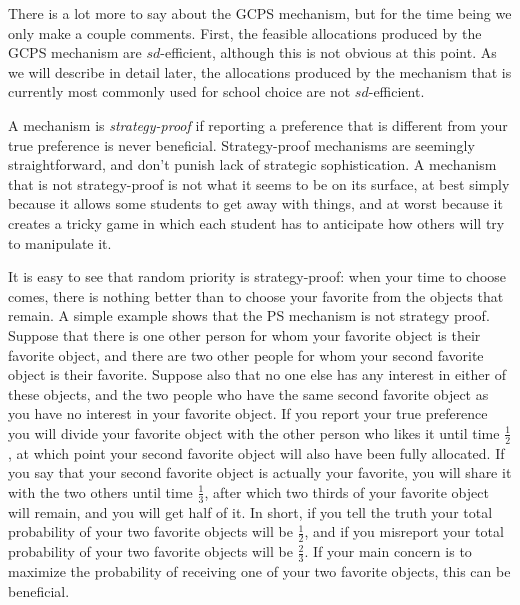 \documentclass[12pt]{article}
\theoremstyle{definition}
\begin{document}
There is a lot more to say about the GCPS mechanism, but for the time
being we only make a couple comments.  First, the feasible allocations
produced by the GCPS mechanism are $sd$-efficient, although this is
not obvious at this point.  As we will describe in detail later, the
allocations produced by the mechanism that is currently most commonly
used for school choice are not $sd$-efficient.

A mechanism is \emph{strategy-proof} if reporting a preference that is
different from your true preference is never beneficial.
Strategy-proof mechanisms are seemingly straightforward, and don't
punish lack of strategic sophistication.  A mechanism that is not
strategy-proof is not what it seems to be on its surface, at best
simply because it allows some students to get away with things, and at
worst because it creates a tricky game in which each student has to
anticipate how others will try to manipulate it.

It is easy to see that random priority is strategy-proof: when your
time to choose comes, there is nothing better than to choose your
favorite from the objects that remain.  A simple example shows that
the PS mechanism is not strategy proof.  Suppose that there is one
other person for whom your favorite object is their favorite object,
and there are two other people for whom your second favorite object is
their favorite.  Suppose also that no one else has any interest in
either of these objects, and the two people who have the same second
favorite object as you have no interest in your favorite object.  If
you report your true preference you will divide your favorite object
with the other person who likes it until time $\tfrac12$, at which
point your second favorite object will also have been fully allocated.
If you say that your second favorite object is actually your favorite,
you will share it with the two others until time $\tfrac13$, after
which two thirds of your favorite object will remain, and you will get
half of it.  In short, if you tell the truth your total probability of
your two favorite objects will be $\tfrac12$, and if you misreport
your total probability of your two favorite objects will be
$\tfrac23$.  If your main concern is to maximize the probability of
receiving one of your two favorite objects, this can be beneficial.
\end{document}
